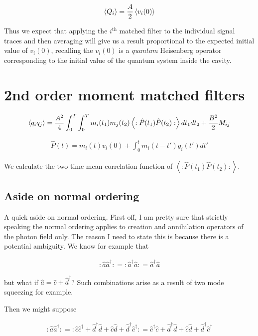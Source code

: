 \documentclass[12pt]{article}
\begin{document}
\begin{align}
\braket{Q_i} = \frac{A}{2} \braket{v_i(0)}
\end{align}

Thus we expect that applying the $i^{\text{th}}$ matched filter to the individual signal traces and then averaging will give us a result proportional to the expected initial value of $v_i(0)$, recalling the $v_i(0)$ is a \textit{quantum} Heisenberg operator corresponding to the initial value of the quantum system inside the cavity.

\section{2nd order moment matched filters}

\begin{align}
\braket{q_iq_j} = \frac{A^2}{4}\int_0^T\int_0^T m_i(t_1) m_j(t_2)\left<:\hat{P}(t_1)\hat{P}(t_2):\right>dt_1dt_2 + \frac{B^2}{2} M_{ij}
\end{align}

\begin{align}
\hat{P}(t) =  m_i(t)v_i(0) + \int_0^t m_i(t-t')g_i(t') dt'
\end{align}

We calculate the two time mean correlation function of $\left<:\hat{P}(t_1)\hat{P}(t_2):\right>$.

\subsection{Aside on normal ordering}
A quick aside on normal ordering. First off, I am pretty sure that strictly speaking the normal ordering applies to creation and annihilation operators of the photon field only. The reason I need to state this is because there is a potential ambiguity. We know for example that

\begin{align}
:\hat{a}\hat{a}^{\dag}: = :\hat{a}^{\dag}\hat{a}: = \hat{a}^{\dag}\hat{a}
\end{align}

but what if $\hat{a} = \hat{c}+\hat{d}^{\dag}$? Such combinations arise as a result of two mode squeezing for example.

Then we might suppose

\begin{align}
:\hat{a}\hat{a}^{\dag}: = :\hat{c}\hat{c}^{\dag}+\hat{d}^{\dag}\hat{d} + \hat{c}\hat{d}+\hat{d}^{\dag}\hat{c}^{\dag}: = \hat{c}^{\dag}\hat{c}+\hat{d}^{\dag}\hat{d} + \hat{c}\hat{d}+\hat{d}^{\dag}\hat{c}^{\dag}
\end{align}
\end{document}

